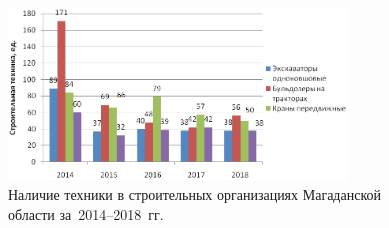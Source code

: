 \begin{figure}[H]

  \begin{center}
    \includegraphics[width=0.8\textwidth]{authors/serebryakova-fig-4.png}
  \end{center}
\vspace{-8pt}
  \caption{Наличие техники в строительных организациях Магаданской области
за~2014--2018~гг.}
  \label{fig:serebryakova-fig-4}
  \vspace{-8pt}
\end{figure}

